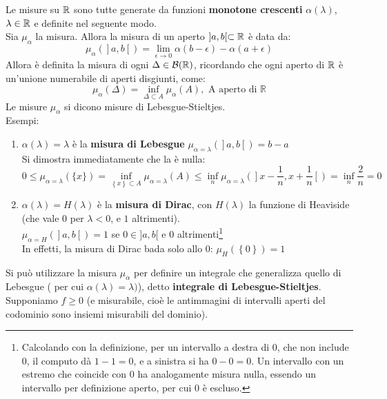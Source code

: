 \documentclass[FisicaTeorica.tex]{subfiles}
\begin{document}
Le misure  su $\mathbb{R}$ sono tutte generate da funzioni \textbf{monotone crescenti} $\alpha\left(\lambda\right)$, $\lambda \in \mathbb{R}$ e definite nel seguente modo.\\
Sia $\mu_\alpha$ la misura. Allora la misura di un aperto $]a,b[ \subset \mathbb{R}$ è data da:
\[ \mu_\alpha\left(\right]a,b\left[\right)=\lim_{\epsilon\rightarrow0} \alpha \left(b-\epsilon\right) - \alpha \left(a+\epsilon\right)\]
Allora è definita la misura di ogni $\Delta \in \mathcal{B}(\mathbb{R})$, ricordando che ogni aperto di $\mathbb{R}$ è un'unione numerabile di aperti disgiunti, come:
\[
\mu_\alpha\left(\Delta\right)=\inf_{\Delta\subset A}{\mu_\alpha(A),\text{\ A\ aperto\ di }\mathbb{R}}
\]
Le misure $\mu_\alpha$ si dicono misure di Lebesgue-Stieltjes.\\
Esempi:
\begin{enumerate}
    \item $\alpha \left(\lambda\right)=\lambda$ è la \textbf{misura di Lebesgue}
	$\mu_{\alpha=\lambda}\left(\right]a,b\left[\right)=b-a$\\
	Si dimostra immediatamente che la  è nulla:
	\[ 0\leq \mu_{\alpha=\lambda}\left(\{x\}\right)=\inf_{\left\{x\right\}\subset A}{\mu_{\alpha=\lambda}\left(A\right)\le\inf_n{\mu_{\alpha=\lambda}\left(\right]x-\frac{1}{n},x+\frac{1}{n}\left[\right)=\inf_n{\frac{2}{n}=0}}} \]
	\item $\alpha \left(\lambda\right)=H\left(\lambda\right)$ è la \textbf{misura di Dirac}, con $H(\lambda)$ la funzione di Heaviside (che vale $0$ per $\lambda <0$, e $1$ altrimenti).\\
	$\mu_{\alpha=H}\left(\right]a,b\left[\right)=1$ se $0\in]a,b[$ e $0$ altrimenti\footnote{Calcolando con la definizione, per un intervallo a destra di $0$, che non include $0$, il computo dà $1-1 = 0$, e a sinistra si ha $0-0 = 0$. Un intervallo con un estremo che coincide con $0$ ha analogamente misura nulla, essendo un intervallo per definizione aperto, per cui $0$ è escluso.}\\
	In effetti, la misura di Dirac bada solo allo $0$: $\mu_H\left(\left\{0\right\}\right)=1$
\end{enumerate}
Si può utilizzare la misura $\mu_\alpha$ per definire un integrale che generalizza quello di Lebesgue ( per cui $\alpha \left(\lambda\right)= \lambda)$), detto \textbf{integrale di Lebesgue-Stieltjes}.\\
Supponiamo $f\geq 0$ (e misurabile, cioè le antimmagini di intervalli aperti del codominio sono insiemi misurabili del dominio).\\
\end{document}
